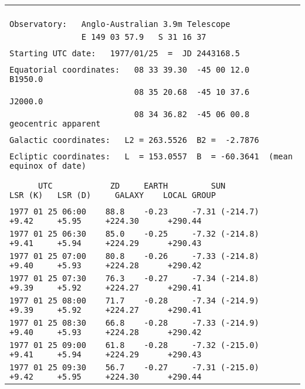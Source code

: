 \begin{center}
\begin{tabular}{|l|}
\hline
\verb|                                                                                                                                    |\\
\verb|Observatory:   Anglo-Australian 3.9m Telescope|\\
\verb|               E 149 03 57.9   S 31 16 37|\\
\\
\verb|Starting UTC date:   1977/01/25  =  JD 2443168.5|\\
\\
\verb|Equatorial coordinates:   08 33 39.30  -45 00 12.0   B1950.0|\\
\verb|                          08 35 20.68  -45 10 37.6   J2000.0|\\
\verb|                          08 34 36.82  -45 06 00.8   geocentric apparent|\\
\\
\verb|Galactic coordinates:   L2 = 263.5526  B2 =  -2.7876|\\
\\
\verb|Ecliptic coordinates:   L  = 153.0557  B  = -60.3641  (mean equinox of date)|\\
\\
\\
\verb|      UTC            ZD     EARTH         SUN            LSR (K)   LSR (D)     GALAXY    LOCAL GROUP|\\
\\
\verb|1977 01 25 06:00    88.8    -0.23     -7.31 (-214.7)      +9.42     +5.95     +224.30      +290.44|\\
\verb|1977 01 25 06:30    85.0    -0.25     -7.32 (-214.8)      +9.41     +5.94     +224.29      +290.43|\\
\verb|1977 01 25 07:00    80.8    -0.26     -7.33 (-214.8)      +9.40     +5.93     +224.28      +290.42|\\
\verb|1977 01 25 07:30    76.3    -0.27     -7.34 (-214.8)      +9.39     +5.92     +224.27      +290.41|\\
\verb|1977 01 25 08:00    71.7    -0.28     -7.34 (-214.9)      +9.39     +5.92     +224.27      +290.41|\\
\verb|1977 01 25 08:30    66.8    -0.28     -7.33 (-214.9)      +9.40     +5.93     +224.28      +290.42|\\
\verb|1977 01 25 09:00    61.8    -0.28     -7.32 (-215.0)      +9.41     +5.94     +224.29      +290.43|\\
\verb|1977 01 25 09:30    56.7    -0.27     -7.31 (-215.0)      +9.42     +5.95     +224.30      +290.44|\\

\end{tabular}
\end{center}
